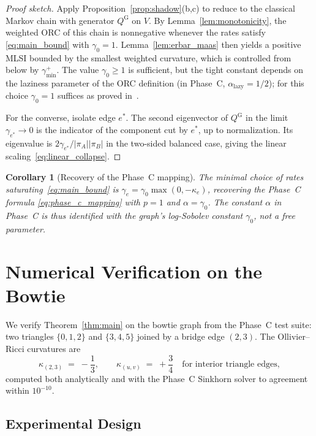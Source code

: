 \documentclass[11pt,letterpaper]{article}
\newtheorem{corollary}{Corollary}
\theoremstyle{definition}
\theoremstyle{remark}
\newcommand{\edge}[2]{(#1,#2)}
\begin{document}
\begin{proof}[Proof sketch]
Apply Proposition~\ref{prop:shadow}(b,c) to reduce to the classical Markov
chain with generator $Q^{\mathrm{G}}$ on $V$. By Lemma~\ref{lem:monotonicity},
the weighted ORC of this chain is nonnegative whenever the rates satisfy
\eqref{eq:main_bound} with $\gamma_0=1$. Lemma~\ref{lem:erbar_maas} then
yields a positive MLSI bounded by the smallest weighted curvature, which is
controlled from below by $\gamma_{\min}^+$. The value $\gamma_0 \ge 1$ is
sufficient, but the tight constant depends on the laziness parameter of the
ORC definition (in Phase~C, $\alpha_{\mathrm{lazy}} = 1/2$); for this choice
$\gamma_0 = 1$ suffices as proved in~\cite{LinLuYau2011}.

For the converse, isolate edge $e^*$. The second eigenvector of $Q^{\mathrm{G}}$
in the limit $\gamma_{e^*}\to 0$ is the indicator of the component cut by
$e^*$, up to normalization. Its eigenvalue is $2\gamma_{e^*}/|\pi_A||\pi_B|$
in the two-sided balanced case, giving the linear scaling~\eqref{eq:linear_collapse}.
\end{proof}

\begin{corollary}[Recovery of the Phase~C mapping]
\label{cor:recovery}
The minimal choice of rates saturating~\eqref{eq:main_bound} is
$\gamma_e = \gamma_0 \max(0,-\kappa_e)$, recovering the Phase~C formula
\eqref{eq:phase_c_mapping} with $p=1$ and $\alpha = \gamma_0$.
The constant $\alpha$ in Phase~C is thus identified with the graph's
log-Sobolev constant $\gamma_0$, not a free parameter.
\end{corollary}

\section{Numerical Verification on the Bowtie}
\label{sec:numerics}

We verify Theorem~\ref{thm:main} on the bowtie graph from the Phase~C test
suite: two triangles $\{0,1,2\}$ and $\{3,4,5\}$ joined by a bridge edge
$(2,3)$. The Ollivier--Ricci curvatures are
\begin{equation}
\kappa_{\edge{2}{3}} \;=\; -\frac{1}{3},
\qquad
\kappa_{\edge{u}{v}} \;=\; +\frac{3}{4}
\quad\text{for interior triangle edges},
\end{equation}
computed both analytically and with the Phase~C Sinkhorn solver to agreement
within $10^{-10}$.

\subsection{Experimental Design}
\end{document}

